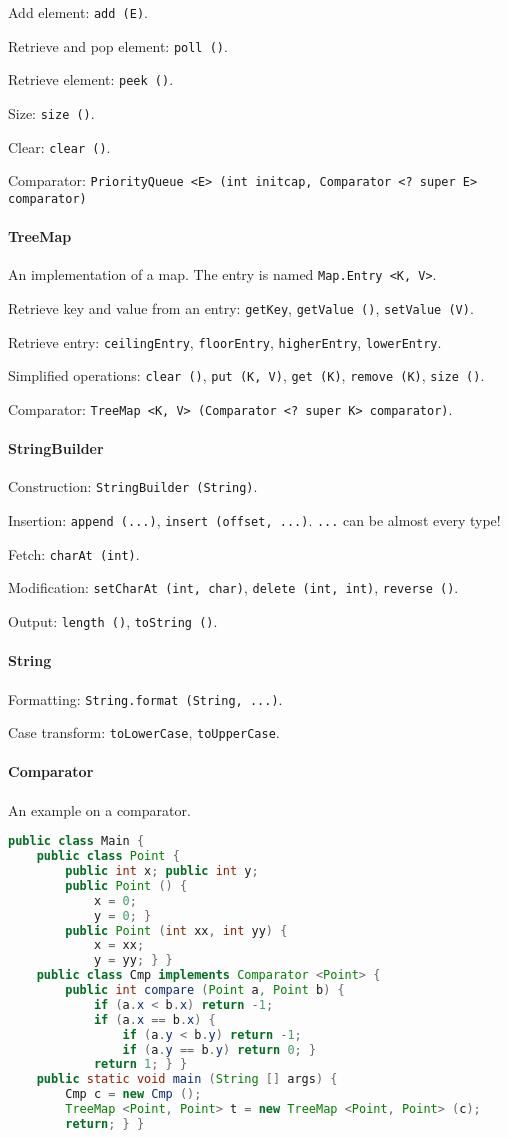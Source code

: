 Add element: \texttt{add (E)}.

Retrieve and pop element: \texttt{poll ()}.

Retrieve element: \texttt{peek ()}.

Size: \texttt{size ()}.

Clear: \texttt{clear ()}.

Comparator: \texttt{PriorityQueue <E> (int initcap, Comparator <? super E> comparator)}

\paragraph{TreeMap}
An implementation of a map. The entry is named \texttt{Map.Entry <K, V>}.

Retrieve key and value from an entry: \texttt{getKey}, \texttt{getValue ()}, \texttt{setValue (V)}.

Retrieve entry: \texttt{ceilingEntry}, \texttt{floorEntry}, \texttt{higherEntry}, \texttt{lowerEntry}.

Simplified operations: \texttt{clear ()}, \texttt{put (K, V)}, \texttt{get (K)}, \texttt{remove (K)}, \texttt{size ()}.

Comparator: \texttt{TreeMap <K, V> (Comparator <? super K> comparator)}.

\paragraph{StringBuilder}

Construction: \texttt{StringBuilder (String)}.

Insertion: \texttt{append (...)}, \texttt{insert (offset, ...)}. \texttt{...} can be almost every type!

Fetch: \texttt{charAt (int)}.

Modification: \texttt{setCharAt (int, char)}, \texttt{delete (int, int)}, \texttt{reverse ()}.

Output: \texttt{length ()}, \texttt{toString ()}.

\paragraph{String}
Formatting: \texttt{String.format (String, ...)}.

Case transform: \texttt{toLowerCase}, \texttt{toUpperCase}.

\paragraph{Comparator}
An example on a comparator.
\begin{lstlisting}[language=java]
public class Main {
	public class Point {
		public int x; public int y;
		public Point () {
			x = 0;
			y = 0; }
		public Point (int xx, int yy) {
			x = xx;
			y = yy; } }
	public class Cmp implements Comparator <Point> {
		public int compare (Point a, Point b) {
			if (a.x < b.x) return -1;
			if (a.x == b.x) {
				if (a.y < b.y) return -1;
				if (a.y == b.y) return 0; }
			return 1; } }
	public static void main (String [] args) {
		Cmp c = new Cmp ();
		TreeMap <Point, Point> t = new TreeMap <Point, Point> (c);
		return; } }
\end{lstlisting}

